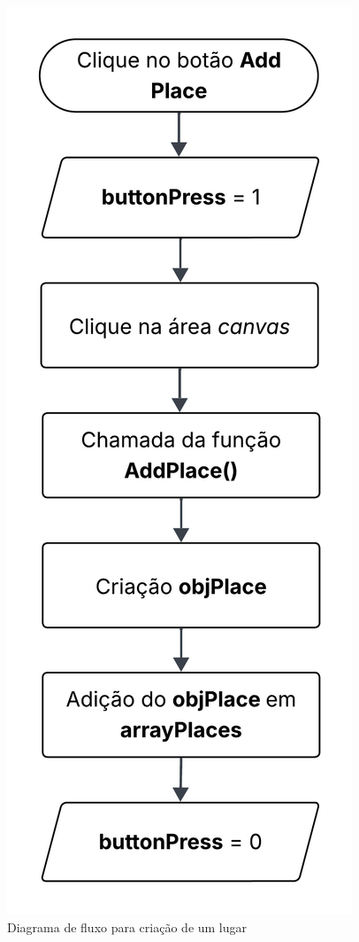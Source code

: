 \documentclass[
	12pt,				%
	openright,			%
	oneside,			%
	a4paper,			%
	english,			%
	brazil				%
	]{abntex2}
\begin{document}
\begin{figure}[ht] 
	\centering
	\includegraphics[scale=0.2]{figuras/diagrama-fluxo-addPlace.png}
	\caption[Diagrama de fluxo para criação de um lugar]{Diagrama de fluxo para criação de um lugar}
	\label{fig:addPlaceDiagram}
\end{figure}
\FloatBarrier
\end{document}
